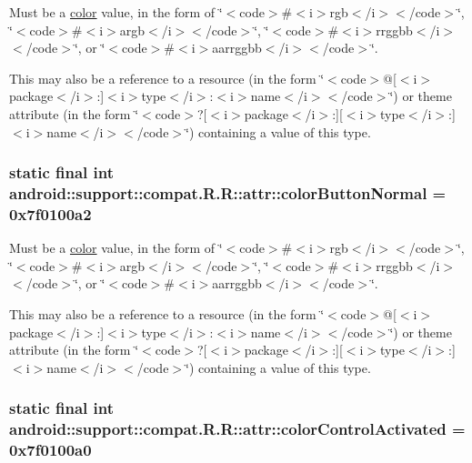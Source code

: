Must be a \hyperlink{classandroid_1_1support_1_1compat_1_1_r_1_1color}{color} value, in the form of \char`\"{}$<$code$>$\#$<$i$>$rgb$<$/i$>$$<$/code$>$\char`\"{}, \char`\"{}$<$code$>$\#$<$i$>$argb$<$/i$>$$<$/code$>$\char`\"{}, \char`\"{}$<$code$>$\#$<$i$>$rrggbb$<$/i$>$$<$/code$>$\char`\"{}, or \char`\"{}$<$code$>$\#$<$i$>$aarrggbb$<$/i$>$$<$/code$>$\char`\"{}. 

This may also be a reference to a resource (in the form \char`\"{}$<$code$>$@\mbox{[}$<$i$>$package$<$/i$>$:\mbox{]}$<$i$>$type$<$/i$>$:$<$i$>$name$<$/i$>$$<$/code$>$\char`\"{}) or theme attribute (in the form \char`\"{}$<$code$>$?\mbox{[}$<$i$>$package$<$/i$>$:\mbox{]}\mbox{[}$<$i$>$type$<$/i$>$:\mbox{]}$<$i$>$name$<$/i$>$$<$/code$>$\char`\"{}) containing a value of this type. \hypertarget{classandroid_1_1support_1_1compat_1_1_r_1_1attr_96b2b59642a6edc9b5e89e925e74bc2d}{
\subsubsection[{colorButtonNormal}]{\setlength{\rightskip}{0pt plus 5cm}static final int android::support::compat.R.R::attr::colorButtonNormal = 0x7f0100a2}}
\label{classandroid_1_1support_1_1compat_1_1_r_1_1attr_96b2b59642a6edc9b5e89e925e74bc2d}


Must be a \hyperlink{classandroid_1_1support_1_1compat_1_1_r_1_1color}{color} value, in the form of \char`\"{}$<$code$>$\#$<$i$>$rgb$<$/i$>$$<$/code$>$\char`\"{}, \char`\"{}$<$code$>$\#$<$i$>$argb$<$/i$>$$<$/code$>$\char`\"{}, \char`\"{}$<$code$>$\#$<$i$>$rrggbb$<$/i$>$$<$/code$>$\char`\"{}, or \char`\"{}$<$code$>$\#$<$i$>$aarrggbb$<$/i$>$$<$/code$>$\char`\"{}. 

This may also be a reference to a resource (in the form \char`\"{}$<$code$>$@\mbox{[}$<$i$>$package$<$/i$>$:\mbox{]}$<$i$>$type$<$/i$>$:$<$i$>$name$<$/i$>$$<$/code$>$\char`\"{}) or theme attribute (in the form \char`\"{}$<$code$>$?\mbox{[}$<$i$>$package$<$/i$>$:\mbox{]}\mbox{[}$<$i$>$type$<$/i$>$:\mbox{]}$<$i$>$name$<$/i$>$$<$/code$>$\char`\"{}) containing a value of this type. \hypertarget{classandroid_1_1support_1_1compat_1_1_r_1_1attr_15216a1eee193a9e389058d3b5694e7d}{
\subsubsection[{colorControlActivated}]{\setlength{\rightskip}{0pt plus 5cm}static final int android::support::compat.R.R::attr::colorControlActivated = 0x7f0100a0}}
\label{classandroid_1_1support_1_1compat_1_1_r_1_1attr_15216a1eee193a9e389058d3b5694e7d}


